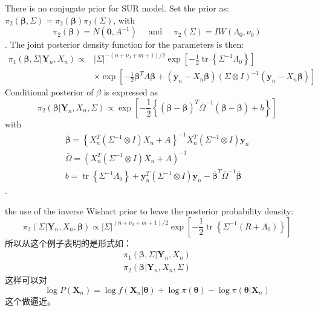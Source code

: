 \documentclass[
]{book}
\theoremstyle{definition}
\theoremstyle{definition}
\theoremstyle{definition}
\theoremstyle{remark}
\begin{document}
There is no conjugate prior for SUR model.
Set the prior as: \(\pi_{2}(\boldsymbol{\beta}, \Sigma)=\pi_{2}(\boldsymbol{\beta}) \pi_{2}(\Sigma)\), with
\[
\pi_{2}(\boldsymbol{\beta})=N\left(\mathbf{0}, A^{-1}\right) \quad \text { and } \quad \pi_{2}(\Sigma)=I W\left(\Lambda_{0}, \nu_{0}\right)
\]
.
The joint posterior density function for the parameters is then:
\[
\begin{aligned} \pi_{1}\left(\boldsymbol{\beta}, \Sigma | \boldsymbol{Y}_{n}, X_{n}\right) \propto &|\Sigma|^{-\left(n+\nu_{0}+m+1\right) / 2} \exp \left[-\frac{1}{2} \operatorname{tr}\left\{\Sigma^{-1} \Lambda_{0}\right\}\right] \\ & \times \exp \left[-\frac{1}{2} \boldsymbol{\beta}^{T} A \boldsymbol{\beta}+\left(\boldsymbol{y}_{n}-X_{n} \boldsymbol{\beta}\right)(\Sigma \otimes I)^{-1}\left(\boldsymbol{y}_{n}-X_{n} \boldsymbol{\beta}\right)\right] \end{aligned}
\]
Conditional posterior of \(\beta\) is expressed as
\[
\pi_{2}\left(\boldsymbol{\beta} | \boldsymbol{Y}_{n}, X_{n}, \Sigma\right) \propto \exp \left[-\frac{1}{2}\left\{(\boldsymbol{\beta}-\overline{\boldsymbol{\beta}})^{T} \bar{\Omega}^{-1}(\boldsymbol{\beta}-\overline{\boldsymbol{\beta}})+b\right\}\right]
\]
with
\[
\begin{array}{l}{\overline{\boldsymbol{\beta}}=\left\{X_{n}^{T}\left(\Sigma^{-1} \otimes I\right) X_{n}+A\right\}^{-1} X_{n}^{T}\left(\Sigma^{-1} \otimes I\right) \boldsymbol{y}_{n}} \\ {\bar{\Omega}=\left(X_{n}^{T}\left(\Sigma^{-1} \otimes I\right) X_{n}+A\right)^{-1}} \\ {b=\operatorname{tr}\left\{\Sigma^{-1} \Lambda_{0}\right\}+\boldsymbol{y}_{n}^{T}\left(\Sigma^{-1} \otimes I\right) \boldsymbol{y}_{n}-\overline{\boldsymbol{\beta}}^{T} \bar{\Omega}^{-1} \overline{\boldsymbol{\beta}}}\end{array}
\]
.

the use of the inverse Wishart prior to leave the posterior probability density:
\[
\pi_{2}\left(\Sigma | \boldsymbol{Y}_{n}, X_{n}, \boldsymbol{\beta}\right) \propto|\Sigma|^{\left(n+\nu_{0}+m+1\right) / 2} \exp \left[-\frac{1}{2} \operatorname{tr}\left\{\Sigma^{-1}\left(R+\Lambda_{0}\right)\right\}\right]
\]
所以从这个例子表明的是形式如：
\[
\begin{align}
\pi_{1}\left(\boldsymbol{\beta}, \Sigma | \boldsymbol{Y}_{n}, X_{n}\right)\\
\pi_{2}\left(\boldsymbol{\beta} | \boldsymbol{Y}_{n}, X_{n}, \Sigma\right)
\end{align}
\]
这样可以对
\[
\log P\left(\boldsymbol{X}_{n}\right)=\log f\left(\boldsymbol{X}_{n} | \boldsymbol{\theta}\right)+\log \pi(\boldsymbol{\theta})-\log \pi\left(\boldsymbol{\theta} | \boldsymbol{X}_{n}\right)
\]
这个做逼近。
\end{document}
